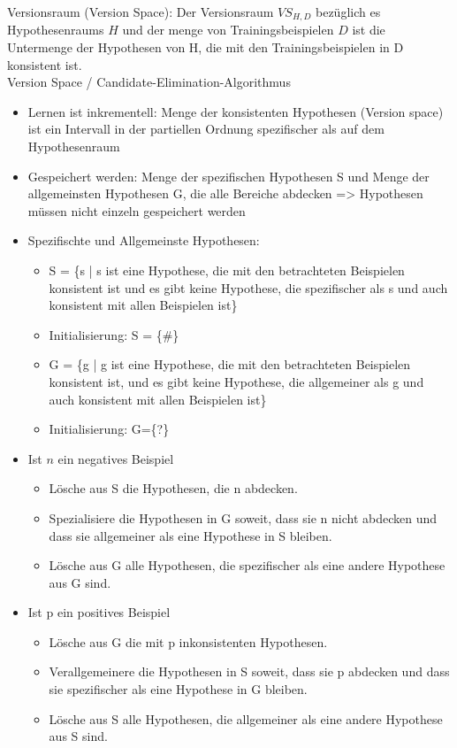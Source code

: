 \documentclass[paper=a4, fontsize=11pt]{scrartcl} %
\numberwithin{equation}{section} %
\numberwithin{figure}{section} %
\numberwithin{table}{section} %
\begin{document}
Versionsraum (Version Space): Der Versionsraum $VS_{H,D}$ bezüglich es Hypothesenraums $H$ und der menge von Trainingsbeispielen $D$ ist die Untermenge der Hypothesen von H, die mit den Trainingsbeispielen in D konsistent ist.\\ 
Version Space / Candidate-Elimination-Algorithmus
\begin{itemize}
\item Lernen ist inkrementell: Menge der konsistenten Hypothesen (Version space) ist ein Intervall in der partiellen Ordnung spezifischer als auf dem Hypothesenraum
\item Gespeichert werden: Menge der spezifischen Hypothesen S und Menge der allgemeinsten Hypothesen G, die alle Bereiche abdecken => Hypothesen müssen nicht einzeln gespeichert werden
\item Spezifischte und Allgemeinste Hypothesen:
\begin{itemize}
\item S = \{s | s ist eine Hypothese, die mit den betrachteten Beispielen konsistent ist und es gibt keine Hypothese, die spezifischer als s und auch konsistent mit allen Beispielen ist\}
\item Initialisierung: S = \{\#\}
\item G = \{g | g ist eine Hypothese, die mit den betrachteten Beispielen konsistent ist, und es gibt keine Hypothese, die allgemeiner als g und auch konsistent mit allen Beispielen ist\} 
\item Initialisierung: G=\{?\}
\end{itemize}
\item Ist $n$ ein negatives Beispiel
\begin{itemize}
\item Lösche aus S die Hypothesen, die n abdecken.
\item Spezialisiere die Hypothesen in G soweit, dass sie n nicht abdecken und dass sie allgemeiner als eine Hypothese in S bleiben.
\item Lösche aus G alle Hypothesen, die spezifischer als eine andere Hypothese aus G sind.
\end{itemize}
\item Ist p ein positives Beispiel
\begin{itemize}
\item Lösche aus G die mit p inkonsistenten Hypothesen.
\item Verallgemeinere die Hypothesen in S soweit, dass sie p abdecken und dass sie spezifischer als eine Hypothese in G bleiben.
\item Lösche aus S alle Hypothesen, die allgemeiner als eine andere Hypothese aus S sind.
\end{itemize}
\end{itemize}
\end{document}
